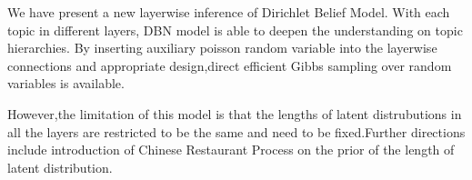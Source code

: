 We have present a new layerwise inference of Dirichlet Belief Model. With each topic in different layers, DBN model is able to deepen the understanding on topic hierarchies. By inserting auxiliary poisson random variable into the layerwise connections and appropriate design,direct efficient Gibbs sampling over random variables is available.

However,the limitation of this model is that the lengths of latent distrubutions in all the layers are restricted to be the same and need to be fixed.Further directions include introduction of Chinese Restaurant Process on the prior of the length of latent distribution.
